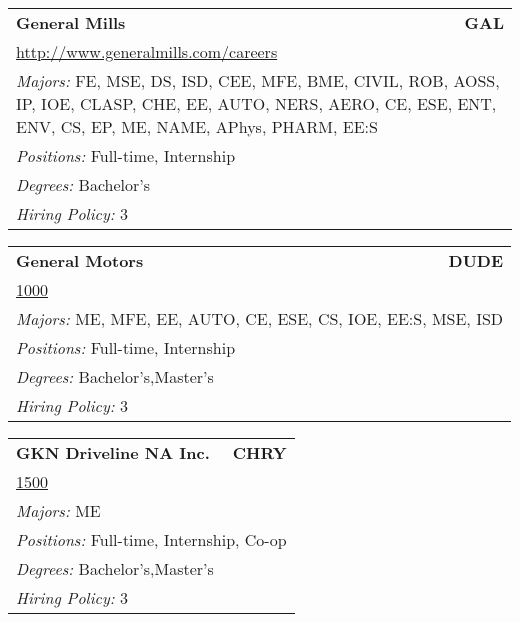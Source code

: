 \documentclass[twoside]{article}
\begin{document}
\begin{center}
\begin{multicols}{3}
\begin{FlushLeft}
\begin{minipage}{\columnwidth}\begin{tabularx}{.95\columnwidth}{Xr}
                 {\Large\bf General Mills} & {\Large\bf GAL}\\
    \multicolumn{2}{p{.95\columnwidth}}{\url{http://www.generalmills.com/careers}}\\
    \multicolumn{2}{p{.95\columnwidth}}{\emph{Majors:} FE, MSE, DS, ISD, CEE, MFE, BME, CIVIL, ROB, AOSS, IP, IOE, CLASP, CHE, EE, AUTO, NERS, AERO, CE, ESE, ENT, ENV, CS, EP, ME, NAME, APhys, PHARM, EE:S}\\
    \multicolumn{2}{p{.95\columnwidth}}{\emph{Positions:} Full-time, Internship}\\
    \multicolumn{2}{p{.95\columnwidth}}{\emph{Degrees:} Bachelor's}\\
    \multicolumn{2}{p{.95\columnwidth}}{\emph{Hiring Policy:} 3}\\
    \end{tabularx}
    
\end{minipage}
 
\begin{minipage}{\columnwidth}\begin{tabularx}{.95\columnwidth}{Xr}
                 {\Large\bf General Motors} & {\Large\bf DUDE}\\
    \multicolumn{2}{p{.95\columnwidth}}{\url{1000}}\\
    \multicolumn{2}{p{.95\columnwidth}}{\emph{Majors:} ME, MFE, EE, AUTO, CE, ESE, CS, IOE, EE:S, MSE, ISD}\\
    \multicolumn{2}{p{.95\columnwidth}}{\emph{Positions:} Full-time, Internship}\\
    \multicolumn{2}{p{.95\columnwidth}}{\emph{Degrees:} Bachelor's,Master's}\\
    \multicolumn{2}{p{.95\columnwidth}}{\emph{Hiring Policy:} 3}\\
    \end{tabularx}
    
\end{minipage}
 
\begin{minipage}{\columnwidth}\begin{tabularx}{.95\columnwidth}{Xr}
                 {\Large\bf GKN Driveline NA Inc.} & {\Large\bf CHRY}\\
    \multicolumn{2}{p{.95\columnwidth}}{\url{1500}}\\
    \multicolumn{2}{p{.95\columnwidth}}{\emph{Majors:} ME}\\
    \multicolumn{2}{p{.95\columnwidth}}{\emph{Positions:} Full-time, Internship, Co-op}\\
    \multicolumn{2}{p{.95\columnwidth}}{\emph{Degrees:} Bachelor's,Master's}\\
    \multicolumn{2}{p{.95\columnwidth}}{\emph{Hiring Policy:} 3}\\
    \end{tabularx}
    

\end{minipage}
\end{FlushLeft}
\end{multicols}
\end{center}
\end{document}
